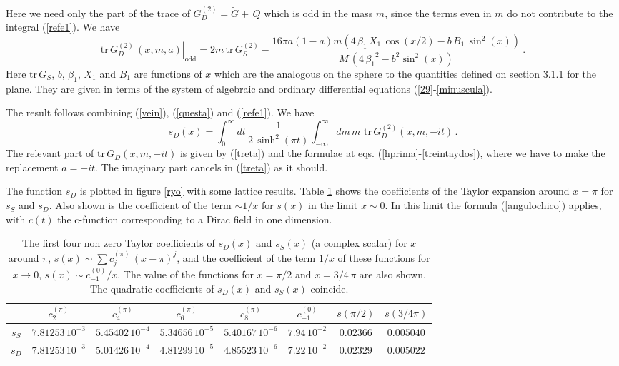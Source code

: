 \documentclass[11pt]{article}
\begin{document}
 
 

Here we need only the part of the trace of $G_D^{(2)}= \tilde{G}+ \, Q$ which is odd in the mass $m$, since the terms even in $m$ do not contribute to the integral (\ref{refe1}). We have
\begin{equation}
  \left. \textrm{tr}\,G^{(2)}_D\,(x,m,a)\right|_{\textrm{odd}}=2 m\, \textrm{tr}\, G_S^{(2)} - \frac{16 \pi a(1-a) m\left(4\, \beta_1\,X_1  \,\cos (x/2)  - b\,B_1 \,{\sin^2 (x)} \right)}{M\,\left( 4\,{{{\beta }_1}}^2 -b^2 \sin^2 (x)  \right)} 
\,.  \label{treta}
\end{equation}
Here $\textrm{tr} \,G_S$, $b$, $\beta_1$, $X_1$ and $B_1$ are functions of $x$ which are the analogous on the sphere to the quantities defined on section 3.1.1 for the plane. They are given in terms of the system of algebraic and ordinary differential equations (\ref{29}-\ref{minuscula}). 

  The result follows combining  (\ref{vein}), (\ref{questa}) and (\ref{refe1}). We have  
\begin{equation}
s_D(x)= \int_0^\infty dt \, \frac{1}{2\,\sinh^2(\pi t)}  \int_{-\infty}^{\infty}dm\,m\,\,\textrm{tr} \,G_D^{(2)}(x,m,-i t)\,.
\end{equation}
The relevant part of $\textrm{tr} \,G_D(x,m,-i t)$ is given by (\ref{treta}) and the formulae at eqs. (\ref{hprima}-\ref{treintaydos}), where we have to make the replacement $a=-i t$. The imaginary part cancels in (\ref{treta}) as it should. 

The function $s_D$ is plotted in figure \ref{ryo} with some lattice results. Table \ref{tatata} shows the coefficients of the Taylor expansion around $x=\pi$ for $s_S$ and $s_D$. Also shown is the coefficient of the term $\sim 1/x$ for $s(x)$ in the limit $x\sim 0$. In this limit the formula (\ref{angulochico}) applies, with $c(t)$ the c-function corresponding to a Dirac field in one dimension.

\begin{table}[t]
\centering
\small
\begin{tabular}{|c|ccccccc|} \hline
 & $c^{(\pi)}_2$ & $c^{(\pi)}_4$ & $c^{(\pi)}_6$ & $c^{(\pi)}_8$ & $c_{-1}^{(0)}$ & $s(\pi/2)$ & $s(3/4 \pi)$   \\  \hline
$s_S$ & $7.81253\, 10^{-3}$ & $5.45402 \,10^{-4}$ & $5.34656 \,10^{-5}$ & $5.40167 \,10^{-6}$ & $7.94 \, 10^{-2}$  & $0.02366$ & $0.005040$\\
$s_D$ & $7.81253 \,10^{-3}$ & $5.01426\, 10^{-4}$ & $4.81299\, 10^{-5}$ & $4.85523\, 10^{-6}$ & $7.22 \, 10^{-2}$ & $0.02329$ & $0.005022$  \\  \hline
\end{tabular} 
\caption{The first four non zero Taylor coefficients of $s_D(x)$ and $s_S(x)$ (a complex scalar)  for $x$ around $\pi$, $s(x)\sim \sum c^{(\pi)}_j\, (x-\pi)^j$,  and the coefficient of the term $1/x$ of these functions for $x\rightarrow 0$, $s(x)\sim  c_{-1}^{(0)}/x$. The value of the functions for $x=\pi/2$ and $x=3/4\, \pi$ are also shown.  The quadratic coefficients of $s_D(x)$ and $s_S(x)$ coincide. }
\label{tatata}
\end{table}
\end{document}
